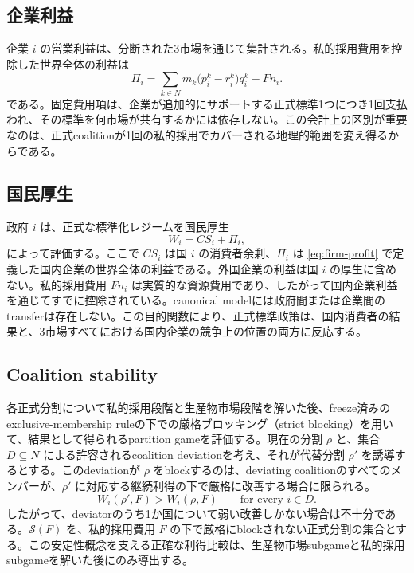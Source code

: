 \subsection{企業利益}
\label{subsec:model-profits}

企業 $i$ の営業利益は、分断された3市場を通じて集計される。私的採用費用を控除した世界全体の利益は
\begin{equation}
    \Pi_i
    =\sum_{k\in N}m_k\bigl(p_i^k-r_i^k\bigr)q_i^k-Fn_i.
    \label{eq:firm-profit}
\end{equation}
である。固定費用項は、企業が追加的にサポートする正式標準1つにつき1回支払われ、その標準を何市場が共有するかには依存しない。この会計上の区別が重要なのは、正式coalitionが1回の私的採用でカバーされる地理的範囲を変え得るからである。

\subsection{国民厚生}
\label{subsec:model-welfare}

政府 $i$ は、正式な標準化レジームを国民厚生
\begin{equation}
    W_i=CS_i+\Pi_i,
    \label{eq:national-welfare}
\end{equation}
によって評価する。ここで $CS_i$ は国 $i$ の消費者余剰、$\Pi_i$ は \eqref{eq:firm-profit} で定義した国内企業の世界全体の利益である。外国企業の利益は国 $i$ の厚生に含めない。私的採用費用 $Fn_i$ は実質的な資源費用であり、したがって国内企業利益を通じてすでに控除されている。canonical modelには政府間または企業間のtransferは存在しない。この目的関数により、正式標準政策は、国内消費者の結果と、3市場すべてにおける国内企業の競争上の位置の両方に反応する。

\subsection{Coalition stability}
\label{subsec:model-stability}

各正式分割について私的採用段階と生産物市場段階を解いた後、freeze済みのexclusive-membership ruleの下での厳格ブロッキング（strict blocking）を用いて、結果として得られるpartition gameを評価する。現在の分割 $\rho$ と、集合 $D\subseteq N$ による許容されるcoalition deviationを考え、それが代替分割 $\rho'$ を誘導するとする。このdeviationが $\rho$ をblockするのは、deviating coalitionのすべてのメンバーが、$\rho'$ に対応する継続利得の下で厳格に改善する場合に限られる。
\begin{equation}
    W_i(\rho',F)>W_i(\rho,F)
    \qquad\text{for every }i\in D.
    \label{eq:strict-blocking}
\end{equation}
したがって、deviatorのうち1か国について弱い改善しかない場合は不十分である。$\mathcal S(F)$ を、私的採用費用 $F$ の下で厳格にblockされない正式分割の集合とする。この安定性概念を支える正確な利得比較は、生産物市場subgameと私的採用subgameを解いた後にのみ導出する。

